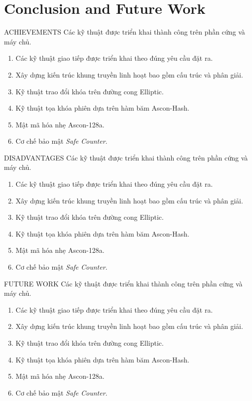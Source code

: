 \section{Conclusion and Future Work}
\begin{frame}{ACHIEVEMENTS}
Các kỹ thuật được triển khai thành công trên phần cứng và máy chủ.
\begin{enumerate}
	\item Các kỹ thuật giao tiếp được triển khai theo đúng yêu cầu đặt ra.
	\item Xây dựng kiến trúc khung truyền linh hoạt bao gồm cấu trúc và phân giải.
	\item Kỹ thuật trao đổi khóa trên đường cong Elliptic.
	\item Kỹ thuật tọa khóa phiên dựa trên hàm băm Ascon-Hash.
	\item Mật mã hóa nhẹ Ascon-128a.
	\item Cơ chế bảo mật \textit{Safe Counter}.
\end{enumerate}
\end{frame}

\begin{frame}{DISADVANTAGES}
Các kỹ thuật được triển khai thành công trên phần cứng và máy chủ.
\begin{enumerate}
	\item Các kỹ thuật giao tiếp được triển khai theo đúng yêu cầu đặt ra.
	\item Xây dựng kiến trúc khung truyền linh hoạt bao gồm cấu trúc và phân giải.
	\item Kỹ thuật trao đổi khóa trên đường cong Elliptic.
	\item Kỹ thuật tọa khóa phiên dựa trên hàm băm Ascon-Hash.
	\item Mật mã hóa nhẹ Ascon-128a.
	\item Cơ chế bảo mật \textit{Safe Counter}.
\end{enumerate}
\end{frame}

\begin{frame}{FUTURE WORK}
Các kỹ thuật được triển khai thành công trên phần cứng và máy chủ.
\begin{enumerate}
	\item Các kỹ thuật giao tiếp được triển khai theo đúng yêu cầu đặt ra.
	\item Xây dựng kiến trúc khung truyền linh hoạt bao gồm cấu trúc và phân giải.
	\item Kỹ thuật trao đổi khóa trên đường cong Elliptic.
	\item Kỹ thuật tọa khóa phiên dựa trên hàm băm Ascon-Hash.
	\item Mật mã hóa nhẹ Ascon-128a.
	\item Cơ chế bảo mật \textit{Safe Counter}.
\end{enumerate}
\end{frame}
